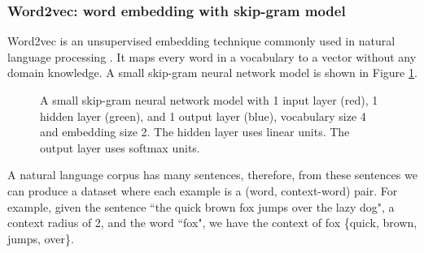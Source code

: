 \documentclass{article} %
\begin{document}
\subsubsection{Word2vec: word embedding with skip-gram model}
Word2vec is an unsupervised embedding technique commonly used in natural language processing \citep{mikolov2013linguistic}.
It maps every word in a vocabulary to a vector without any domain knowledge.
A small skip-gram neural network model is shown in Figure \ref{fig:skipGram}.
\begin{figure}[h]
	\centering
	\newcommand{\layersep}{2cm}
	\newcommand{\vocabularySize}{4}
	\newcommand{\embeddingSize}{2}
	
	\caption{
		A small skip-gram neural network model with
		1 input layer (red), 1 hidden layer (green), and 1 output layer (blue),
		vocabulary size 4 and embedding size 2.
		The hidden layer uses linear units.
		The output layer uses softmax units.
	}
	\label{fig:skipGram}
\end{figure}
A natural language corpus has many sentences,
therefore, from these sentences we can produce a dataset where each example is a (word, context-word) pair.
For example, given the sentence ``the quick brown fox jumps over the lazy dog", a context radius of 2, and the word ``fox", we have the context of fox \{quick, brown, jumps, over\}.
\end{document}
